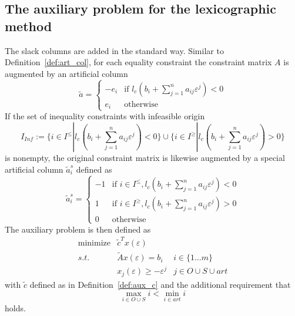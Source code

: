 \documentclass[a4paper]{article}
\begin{document}
\subsection{The auxiliary problem for the lexicographic method}
The slack columns are added in the standard way.
Similar to Definition~\ref{def:art_col}, for each equality constraint the constraint
matrix $A$ is augmented by an artificial column
\[
 \tilde{a} =  \left\{
	        \begin{array}{ll}
  		  -e_{i} &
		    \mbox{if $l_{c}\left(
		      b_{i} + \sum_{j=1}^{n}a_{ij}\varepsilon^{j}\right)< 0$}\\
		   e_{i}  & \mbox{otherwise}
	        \end{array}
 	       \right.
\]
If the set of inequality constraints with infeasible origin
\[
  I_{Inf}:=\{i \in I^{\leq}\left|\right. l_{c}\left(b_{i} +
    \sum_{j=1}^{n}a_{ij}\varepsilon^{j}\right) < 0\} \cup
    \{i \in I^{\geq}\left|\right. l_{c}\left(b_{i} +
    \sum_{j=1}^{n}a_{ij}\varepsilon^{j}\right) > 0\}
\]
is nonempty, the original constraint matrix is likewise augmented by a special
artificial column $\tilde{a}_{i}^{s}$ defined as
\[
  \tilde{a}^{s}_{i} =  \left\{
	                 \begin{array}{ll}
  		           -1 & \mbox{if $i \in I^{\leq},
			    l_{c}\left(b_{i} +
			     \sum_{j=1}^{n}a_{ij}\varepsilon^{j}\right) < 0$}\\
		            1 & \mbox{if $i \in I^{\geq},
			    l_{c}\left(b_{i} +
			      \sum_{j=1}^{n}a_{ij}\varepsilon^{j}\right)> 0$}\\
		            0 & \mbox{otherwise}
	                 \end{array}
 	               \right.
\]
The auxiliary problem is then defined as
\begin{eqnarray}
\label{def:aux_prob}
 \mbox{minimize} &  \tilde{c}^{T}x(\varepsilon)   & 	  \nonumber \\
	s.t.	 & \tilde{A}x(\varepsilon) = b_{i} & i \in \{1 \ldots m \}   \\
		 & x_{j}(\varepsilon) \geq -\varepsilon^{j} &
		   j \in O \cup S \cup art \nonumber 
\end{eqnarray}
with $\tilde{c}$ defined as in Definition~\ref{def:aux_c} and the additional
requirement that 
\begin{equation}
\label{req:order_eps}
\max_{i \in O \cup S}i < \min_{i \in art}i
\end{equation} 
holds.
\end{document}
